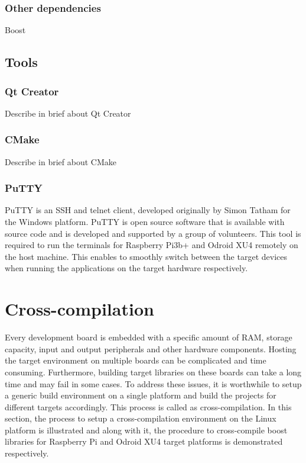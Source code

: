 \subsubsection{Other dependencies}
Boost

\subsection{Tools}
\subsubsection{Qt Creator}
Describe in brief about Qt Creator
\subsubsection{CMake}
Describe in brief about CMake
\subsubsection{PuTTY}
PuTTY is an SSH and telnet client, developed originally by Simon Tatham for the Windows platform\cite{b_putty}. PuTTY is open source software that is available with source code and is developed and supported by a group of volunteers\cite{b_putty}. This tool is required to run the terminals for Raspberry Pi3b+ and Odroid XU4 remotely on the host machine. This enables to smoothly switch between the target devices when running the applications on the target hardware respectively.

\section{Cross-compilation}
Every development board is embedded with a specific amount of RAM, storage capacity, input and output peripherals and other hardware components. Hosting the target environment on multiple boards can be complicated and time consuming. Furthermore, building target libraries on these boards can take a long time and may fail in some cases. To address these issues, it is worthwhile to setup a generic build environment on a single platform and build the projects for different targets accordingly. This process is called as cross-compilation. In this section, the process to setup a cross-compilation environment on the Linux platform is illustrated and along with it, the procedure to cross-compile boost libraries for Raspberry Pi and Odroid XU4 target platforms is demonstrated respectively.

